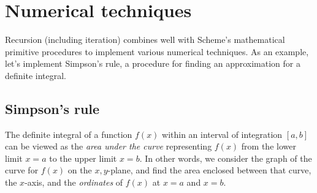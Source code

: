 \chapter{Numerical techniques}
\label{numint}

Recursion (including iteration) combines well with
Scheme's mathematical primitive procedures to implement
various numerical techniques.  As an example,
let's implement Simpson's rule, a procedure for finding
an approximation for a definite integral.  

\section{Simpson's rule}

The definite integral of a function $f(x)$ within an
interval of integration $[a,b]$ can be viewed as the
{\em area under the curve} representing $f(x)$ from the
lower limit $x = a$ to the upper limit $x = b$.
In other words, we consider the graph of the curve for
$f(x)$ on the $x,y$-plane, and find the area enclosed
between that curve, the $x$-axis, and the {\em
ordinates} of $f(x)$ at $x = a$ and $x = b$.  

